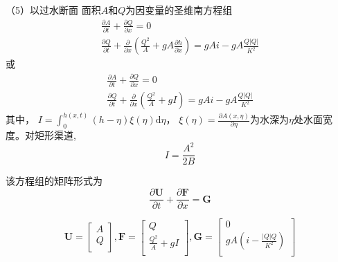 （5）以过水断面
面积$A$和$Q$为因变量的圣维南方程组
\begin{equation}
  \begin{gathered}
    \frac{\partial A}{\partial t}
    +
    \frac{\partial Q}{\partial x}
    =
    0
    \\
    \frac{\partial Q}{\partial t}
    +
    \frac{\partial}{\partial x}\left(\frac{Q^{2}}{A} + gA\frac{\partial h}{\partial x}\right)
    =
    gAi
    -
    gA\frac{Q|Q|}{K^{2}}
  \end{gathered}
  \label{EqCGe_SV_AQ_2}
\end{equation}
或
\begin{equation}
  \begin{gathered}
    \frac{\partial A}{\partial t}
    +
    \frac{\partial Q}{\partial x}
    =
    0
    \\
    \frac{\partial Q}{\partial t}
    +
    \frac{\partial}{\partial x}\left(\frac{Q^{2}}{A}+gI\right)
    =
    gAi
    -gA\frac{Q|Q|}{K^{2}}
  \end{gathered}
  \label{EqCGe_SV_AQ_1}
\end{equation}
其中， $I = \int_{0}^{h(x,t)}(h-\eta)\xi(\eta) \mathrm{d}\eta$，
$\xi(\eta) =\frac{\partial A(x, \eta )}{\partial \eta}$为水深为$\eta$处水面宽
度。对矩形渠道,\
\begin{equation}
  I = \frac{A^{2 }}{2B}
\end{equation}

该方程组的矩阵形式为
\begin{equation}
\frac{\partial \mathbf{U}}{\partial t} +
\frac{\partial \mathbf{F}}{\partial x} =
\mathbf{G}
\end{equation}

\begin{equation}
  \mathbf{U} =
  \begin{bmatrix}
    A \\
    Q \\
  \end{bmatrix}
  ,
  \mathbf{F} =
  \begin{bmatrix}
    Q \\
    \frac{Q^{2}}{A}+gI \\
  \end{bmatrix}
  ,
  \mathbf{G} =
  \begin{bmatrix}
    0 \\
    gA(i - \frac{|Q|Q}{K^{2}}) \\
  \end{bmatrix}
\end{equation}

